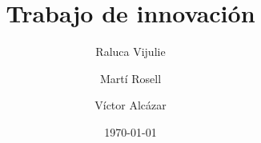 
\author{ Raluca Vijulie \and Martí Rosell \and Víctor Alcázar}
\title{Trabajo de innovación}
\date{\today}

\maketitle
\tableofcontents












